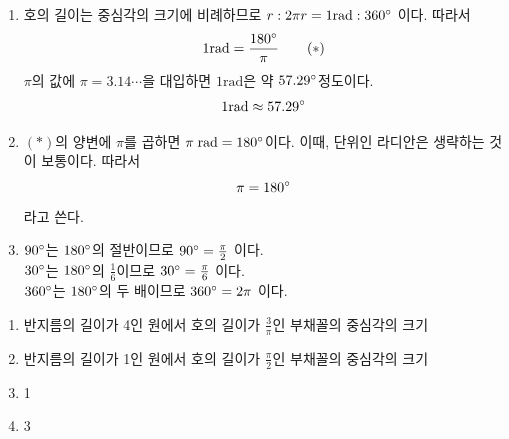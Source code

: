 \documentclass{oblivoir}
\begin{document}
\newpage
%
\rema{}
\begin{enumerate}\label{rad3}
\item
호의 길이는 중심각의 크기에 비례하므로
\(r:2\pi r=1\text{rad}:360\degree\)
이다.
따라서
\[1\text{rad}=\frac{180\degree}{\pi}\tag{$*$}\]
\(\pi\)의 값에 \(\pi=3.14\cdots\)을 대입하면 \(1\text{rad}\)은 약 \(57.29\degree\)정도이다.
\[1\text{rad}\approx57.29\degree\]
\item
\((*)\)의 양변에 \(\pi\)를 곱하면 \(\pi\;\text{rad}=180\degree\)이다.
이때, 단위인 라디안은 생략하는 것이 보통이다.
따라서
\[\pi=180\degree\]
라고 쓴다.
\item
\(90\degree\)는 \(180\degree\)의 절반이므로
\(90\degree=\frac{\pi}2\)
이다.\\
\(30\degree\)는 \(180\degree\)의 \(\frac16\)이므로
\(30\degree=\frac{\pi}6\)
이다.\\
\(360\degree\)는 \(180\degree\)의 두 배이므로
\(360\degree=2\pi\)
이다.
\end{enumerate}

%
\label{rad4}
\par\noindent
{}

%
\begin{enumerate}\label{rad4}
\item
반지름의 길이가 4인 원에서 호의 길이가 \(\frac3\pi\)인 부채꼴의 중심각의 크기
\item
반지름의 길이가 1인 원에서 호의 길이가 \(\frac\pi2\)인 부채꼴의 중심각의 크기
\item
1\degree
\item
3\degree
\end{enumerate}

\end{document}
